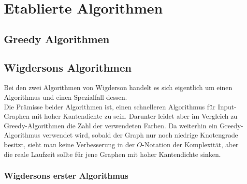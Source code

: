 \documentclass[11pt]{article}
\begin{document}
\section{Etablierte Algorithmen}
\subsection{Greedy Algorithmen} %
\subsection{Wigdersons Algorithmen} %

Bei den zwei Algorithmen von Wigderson handelt es sich eigentlich um einen Algorithmus und einen Spezialfall dessen. \\
Die Prämisse beider Algorithmen ist, einen schnelleren Algorithmus für Input-Graphen mit hoher Kantendichte zu sein.
Darunter leidet aber im Vergleich zu Greedy-Algorithmen die Zahl der verwendeten Farben. Da weiterhin ein Greedy-Algorithmus verwendet wird,
sobald der Graph nur noch niedrige Knotengrade besitzt, sieht man keine Verbesserung in der $O$-Notation der Komplexität, aber die reale Laufzeit sollte
für jene Graphen mit hoher Kantendichte sinken.

\subsubsection{Wigdersons erster Algorithmus}
\end{document}
